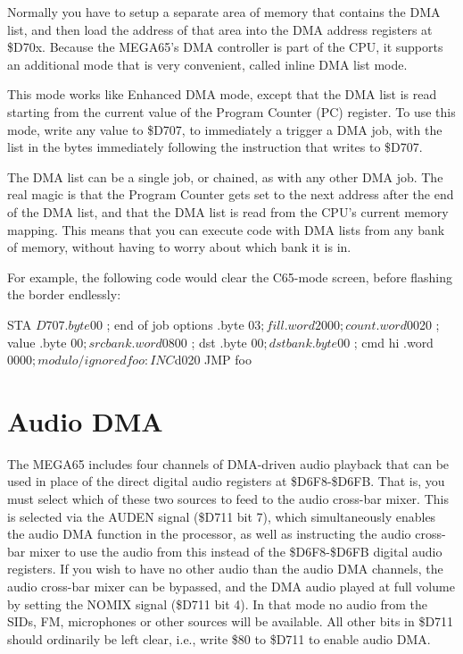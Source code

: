 Normally you have to setup a separate area of memory that contains the DMA list, and then load the address of that
area into the DMA address registers at \$D70x.  Because the MEGA65's DMA controller is part of the CPU, it supports
an additional mode that is very convenient, called inline DMA list mode.  

This mode works like Enhanced DMA mode, except that the DMA list is read starting from the current value of the
Program Counter (PC) register.  To use this mode, write any value to \$D707, to immediately a trigger a DMA job,
with the list in the bytes immediately following the instruction that writes to \$D707.

The DMA list can be a single job, or chained, as with any other DMA job. The
real magic is that the Program Counter gets set to the next address after the end of the DMA list, and that
the DMA list is read from the CPU's current memory mapping. This means that you can execute code with DMA lists
from any bank of memory, without having to worry about which bank it is in.

For example, the following code would clear the C65-mode screen, before flashing the border endlessly:

\begin{screencode}
        STA $D707
        .byte $00   ; end of job options
        .byte $03   ; fill
        .word 2000  ; count
        .word $0020 ; value
        .byte $00   ; src bank
        .word $0800 ; dst
        .byte $00   ; dst bank
        .byte $00   ; cmd hi
        .word $0000 ; modulo / ignored
foo:
        INC $d020
        JMP foo
\end{screencode}

\section{Audio DMA}
The MEGA65 includes four channels of DMA-driven audio playback that can be used in place of the direct digital
audio registers at \$D6F8-\$D6FB.  That is, you must select which of these two sources to feed to the audio
cross-bar mixer.  This is selected via the AUDEN signal (\$D711 bit 7), which simultaneously enables the audio DMA
function in the processor, as well as instructing the audio cross-bar mixer to use the audio from this instead
of the \$D6F8-\$D6FB digital audio registers. If you wish to have no
other audio than the audio DMA channels, the audio cross-bar mixer can
be bypassed, and the DMA audio played at full volume by setting the
NOMIX signal (\$D711 bit 4).  In that mode no audio from the SIDs, FM,
microphones or other sources will be available.
All other bits in
\$D711 should ordinarily be left clear, i.e., write \$80 to \$D711 to
enable audio DMA.

